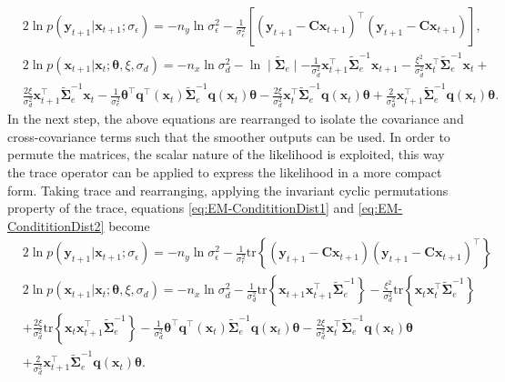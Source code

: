 \documentclass[]{article}
\begin{document}
\begin{align}\label{eq:EM-CondititionDist1}
&2\ln p\left(\mathbf y_{t+1}|\mathbf x_{t+1};\sigma_{\epsilon}\right)=-n_y\ln \sigma_{\epsilon}^2-\frac{1}{\sigma_{\epsilon}^2}\left[ (\mathbf y_{t+1}-\mathbf C\mathbf  x_{t+1})^\top(\mathbf y_{t+1}-\mathbf C\mathbf  x_{t+1})\right],\\
&2\ln p(\mathbf x_{t+1}|\mathbf x_{t};\boldsymbol \theta ,\xi, \sigma_d)=-n_x\ln\sigma_d^2-\ln\mid\tilde{\boldsymbol\Sigma}_e\mid-\frac{1}{\sigma_d^2}\mathbf x_{t+1}^\top\tilde{\boldsymbol\Sigma}_e^{-1}\mathbf x_{t+1}-\frac{\xi^2}{\sigma_d^2}\mathbf x_t^\top\tilde{\boldsymbol\Sigma}_e^{-1}\mathbf x_t+\nonumber \\
&\frac{2\xi}{\sigma_d^2}\mathbf x_{t+1}^\top\tilde{\boldsymbol\Sigma}_e^{-1}\mathbf x_t -\frac{1}{\sigma_e^2}\boldsymbol\theta^\top \mathbf q^\top(\mathbf x_t)\tilde{\boldsymbol\Sigma}_e^{-1}\mathbf q(\mathbf x_t)\boldsymbol\theta-\frac{2\xi}{\sigma_d^2} \mathbf x_t^\top\tilde{\boldsymbol\Sigma}_e^{-1}\mathbf q(\mathbf x_t)\boldsymbol\theta+\frac{2}{\sigma_d^2}\mathbf x_{t+1}^\top\tilde{\boldsymbol\Sigma}_e^{-1}\mathbf q( \mathbf x_t)\boldsymbol\theta. \label{eq:EM-CondititionDist2}
\end{align}
In the next step, the above equations are rearranged to isolate the covariance and cross-covariance terms such that  the smoother outputs can be used. In order to permute the matrices, the scalar nature of the likelihood is exploited, this way the trace operator can be applied to express the likelihood in a more compact form. Taking trace and rearranging, applying the invariant cyclic permutations property of the trace, equations \eqref{eq:EM-CondititionDist1} and \eqref{eq:EM-CondititionDist2} become
\begin{align}\label{eq:EM-Qfunctiontrace1}
 & 2\ln p\left(\mathbf y_{t+1}|\mathbf x_{t+1};\sigma_{\epsilon}\right) = -n_y\ln \sigma_{\epsilon}^2-\frac{1}{\sigma_{\epsilon}^2}\mathrm{tr}\left\lbrace(\mathbf y_{t+1}-\mathbf C\mathbf  x_{t+1}) (\mathbf y_{t+1}-\mathbf C\mathbf  x_{t+1})^\top\right\rbrace  \\ 
&2 \ln p(\mathbf x_{t+1}|\mathbf x_{t};\boldsymbol \theta, \xi, \sigma_d) =-n_x\ln\sigma_d^2-\frac{1}{\sigma_d^2}\mathrm{tr}\left\lbrace\mathbf x_{t+1} \mathbf x_{t+1}^\top\tilde{\boldsymbol\Sigma}_e^{-1}\right\rbrace-\frac{\xi^2}{\sigma_d^2}\mathrm{tr}\left\lbrace \mathbf x_t \mathbf x_t^\top\tilde{\boldsymbol\Sigma}_e^{-1}\right\rbrace \nonumber \\
&+\frac{2\xi}{\sigma_d^2} \mathrm{tr} \left\lbrace \mathbf x_t\mathbf x_{t+1}^\top\tilde{\boldsymbol\Sigma}_e^{-1}\right\rbrace -\frac{1}{\sigma_d^2}\boldsymbol\theta^\top \mathbf q^\top(\mathbf x_t)\tilde{\boldsymbol\Sigma}_e^{-1}\mathbf q(\mathbf x_t)\boldsymbol\theta-\frac{2\xi}{\sigma_d^2} \mathbf x_t^\top\tilde{\boldsymbol\Sigma}_e^{-1}\mathbf q(\mathbf x_t)\boldsymbol\theta \nonumber \\
&+\frac{2}{\sigma_d^2}\mathbf x_{t+1}^\top\tilde{\boldsymbol\Sigma}_e^{-1}\mathbf q( \mathbf x_t)\boldsymbol\theta .\label{eq:EM-Qfunctiontrace2}
\end{align}
\end{document}
